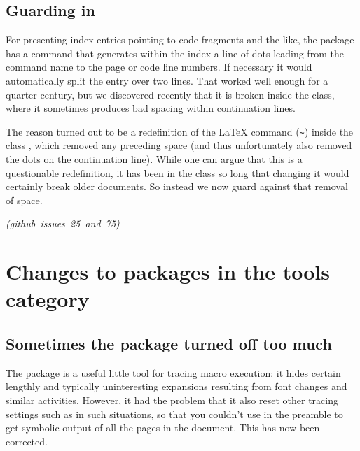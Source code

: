 \documentclass{ltnews}
\newcommand\githubissue[2][]{\ifhmode\unskip\fi
     \quad\penalty500\strut\nobreak\hfill
     \mbox{\small\itshape(github issue#1 #2)}\par}
\newcommand\sxissue[1]{\ifhmode\unskip\fi
     \quad\penalty500\strut\nobreak\hfill
     \mbox{\small\itshape\url(#1)}\par}
\let\cls\pkg
\begin{document}
        
\subsection{Guarding  in }

For presenting index entries pointing to
code fragments and the like,
the  package has a  command that
generates within the index a line of dots leading from 
the command name to the page or code line numbers.
If necessary it would automatically split the entry
over two lines. That worked well enough for a quarter century, but we
discovered recently that it is broken inside 
the \cls{ltugboat} class,
where it sometimes produces 
bad spacing within continuation lines.

The reason turned out to be a redefinition of the \LaTeX{} command
 (\verb=~=) inside the class \cls{ltugboat}, which
removed any preceding space (and thus unfortunately also removed the
dots on the continuation line).  While one can argue that this is a
questionable redefinition, it has been in the class so long that
changing it would certainly break older documents.  So instead we now
guard against that removal of space.
%
\githubissue[s]{25 and 75}

        


        
\section{Changes to packages in the tools category}

\subsection{Sometimes the  package turned off too much}

The  package is a useful little tool for tracing macro
execution: it hides certain lengthly and typically uninteresting
expansions resulting from font changes and similar activities.
However, it had the problem that it also reset other tracing settings
such as  in such situations, so that you couldn't use
 in the preamble to get symbolic output of all the
pages in the document.  This has now been corrected.



%
\end{document}
